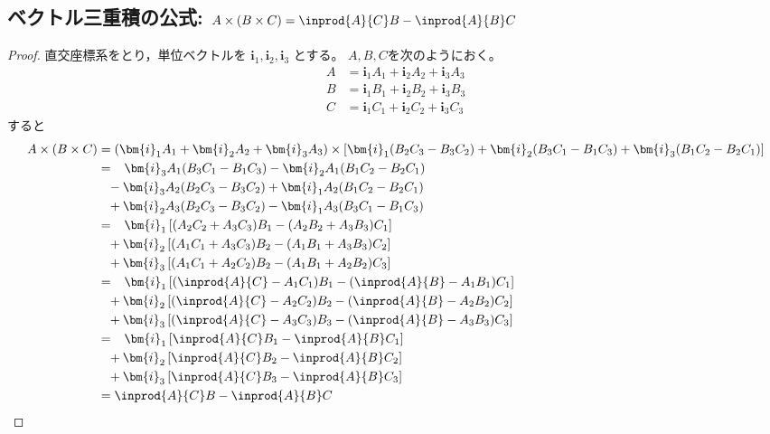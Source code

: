         \subsection{ベクトル三重積の公式: \texorpdfstring{$A\times(B\times C) = \inprod{A}{C}B - \inprod{A}{B}C$}{A×(B×C) = (A・C)B - (A・B)C}}
            \begin{proof}
                \quad\par
                直交座標系をとり，単位ベクトルを $\bm{i}_1,\bm{i}_2,\bm{i}_3$ とする。
                $A,B,C$を次のようにおく。
                \begin{align*}
                    A &= \bm{i}_1 A_1 + \bm{i}_2 A_2 + \bm{i}_3 A_3 \\
                    B &= \bm{i}_1 B_1 + \bm{i}_2 B_2 + \bm{i}_3 B_3 \\
                    C &= \bm{i}_1 C_1 + \bm{i}_2 C_2 + \bm{i}_3 C_3
                \end{align*}
                すると
                \begin{align*}
                    A\times(B\times C) &= (\bm{i}_1 A_1 + \bm{i}_2 A_2 + \bm{i}_3 A_3) \times \left[\bm{i}_1(B_2 C_3 - B_3 C_2) + \bm{i}_2(B_3 C_1 - B_1 C_3) + \bm{i}_3(B_1 C_2 - B_2 C_1)\right] \\
                    &= \phantom{+}\bm{i}_3 A_1(B_3 C_1 - B_1 C_3) - \bm{i}_2 A_1(B_1 C_2 - B_2 C_1) \\
                    &\phantom{=} -\bm{i}_3 A_2(B_2 C_3 - B_3 C_2) + \bm{i}_1 A_2(B_1 C_2 - B_2 C_1) \\
                    &\phantom{=} +\bm{i}_2 A_3(B_2 C_3 - B_3 C_2) - \bm{i}_1 A_3(B_3 C_1 - B_1 C_3) \\
                    &= \phantom{+}\bm{i}_1 \left[(A_2 C_2 + A_3 C_3)B_1 - (A_2 B_2 + A_3 B_3)C_1\right] \\
                    &\phantom{=} + \bm{i}_2 \left[(A_1 C_1 + A_3 C_3)B_2 - (A_1 B_1 + A_3 B_3)C_2\right] \\
                    &\phantom{=} + \bm{i}_3 \left[(A_1 C_1 + A_2 C_2)B_2 - (A_1 B_1 + A_2 B_2)C_3\right] \\
                    &= \phantom{+}\bm{i}_1 \left[(\inprod{A}{C} - A_1 C_1)B_1 - (\inprod{A}{B} - A_1 B_1)C_1\right] \\
                    &\phantom{=} + \bm{i}_2 \left[(\inprod{A}{C} - A_2 C_2)B_2 - (\inprod{A}{B} - A_2 B_2)C_2\right] \\
                    &\phantom{=} + \bm{i}_3 \left[(\inprod{A}{C} - A_3 C_3)B_3 - (\inprod{A}{B} - A_3 B_3)C_3\right] \\
                    &= \phantom{+}\bm{i}_1 \left[\inprod{A}{C}B_1 - \inprod{A}{B}C_1\right] \\
                    &\phantom{=} + \bm{i}_2 \left[\inprod{A}{C}B_2 - \inprod{A}{B}C_2\right] \\
                    &\phantom{=} + \bm{i}_3 \left[\inprod{A}{C}B_3 - \inprod{A}{B}C_3\right] \\
                    &= \inprod{A}{C}B - \inprod{A}{B}C
                \end{align*}
            \end{proof}
